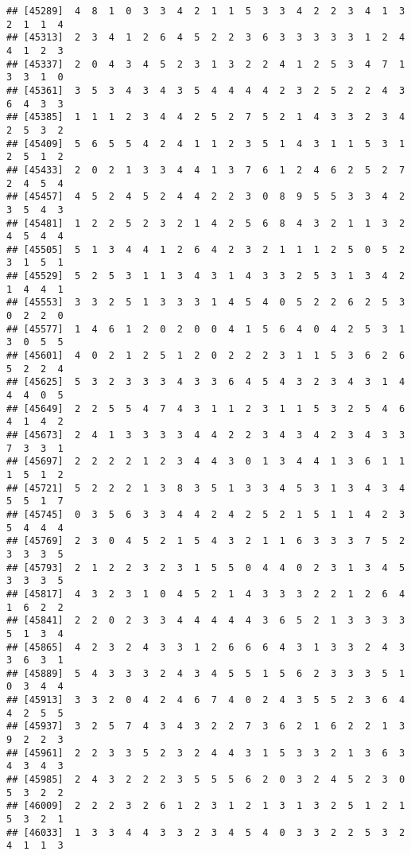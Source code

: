 \documentclass[
]{article}
\begin{document}
\begin{verbatim}
## [45289]  4  8  1  0  3  3  4  2  1  1  5  3  3  4  2  2  3  4  1  3  2  1  1  4
## [45313]  2  3  4  1  2  6  4  5  2  2  3  6  3  3  3  3  3  1  2  4  4  1  2  3
## [45337]  2  0  4  3  4  5  2  3  1  3  2  2  4  1  2  5  3  4  7  1  3  3  1  0
## [45361]  3  5  3  4  3  4  3  5  4  4  4  4  2  3  2  5  2  2  4  3  6  4  3  3
## [45385]  1  1  1  2  3  4  4  2  5  2  7  5  2  1  4  3  3  2  3  4  2  5  3  2
## [45409]  5  6  5  5  4  2  4  1  1  2  3  5  1  4  3  1  1  5  3  1  2  5  1  2
## [45433]  2  0  2  1  3  3  4  4  1  3  7  6  1  2  4  6  2  5  2  7  2  4  5  4
## [45457]  4  5  2  4  5  2  4  4  2  2  3  0  8  9  5  5  3  3  4  2  3  5  4  3
## [45481]  1  2  2  5  2  3  2  1  4  2  5  6  8  4  3  2  1  1  3  2  4  5  4  4
## [45505]  5  1  3  4  4  1  2  6  4  2  3  2  1  1  1  2  5  0  5  2  3  1  5  1
## [45529]  5  2  5  3  1  1  3  4  3  1  4  3  3  2  5  3  1  3  4  2  1  4  4  1
## [45553]  3  3  2  5  1  3  3  3  1  4  5  4  0  5  2  2  6  2  5  3  0  2  2  0
## [45577]  1  4  6  1  2  0  2  0  0  4  1  5  6  4  0  4  2  5  3  1  3  0  5  5
## [45601]  4  0  2  1  2  5  1  2  0  2  2  2  3  1  1  5  3  6  2  6  5  2  2  4
## [45625]  5  3  2  3  3  3  4  3  3  6  4  5  4  3  2  3  4  3  1  4  4  4  0  5
## [45649]  2  2  5  5  4  7  4  3  1  1  2  3  1  1  5  3  2  5  4  6  4  1  4  2
## [45673]  2  4  1  3  3  3  3  4  4  2  2  3  4  3  4  2  3  4  3  3  7  3  3  1
## [45697]  2  2  2  2  1  2  3  4  4  3  0  1  3  4  4  1  3  6  1  1  1  5  1  2
## [45721]  5  2  2  2  1  3  8  3  5  1  3  3  4  5  3  1  3  4  3  4  5  5  1  7
## [45745]  0  3  5  6  3  3  4  4  2  4  2  5  2  1  5  1  1  4  2  3  5  4  4  4
## [45769]  2  3  0  4  5  2  1  5  4  3  2  1  1  6  3  3  3  7  5  2  3  3  3  5
## [45793]  2  1  2  2  3  2  3  1  5  5  0  4  4  0  2  3  1  3  4  5  3  3  3  5
## [45817]  4  3  2  3  1  0  4  5  2  1  4  3  3  3  2  2  1  2  6  4  1  6  2  2
## [45841]  2  2  0  2  3  3  4  4  4  4  4  3  6  5  2  1  3  3  3  3  5  1  3  4
## [45865]  4  2  3  2  4  3  3  1  2  6  6  6  4  3  1  3  3  2  4  3  3  6  3  1
## [45889]  5  4  3  3  3  2  4  3  4  5  5  1  5  6  2  3  3  3  5  1  0  3  4  4
## [45913]  3  3  2  0  4  2  4  6  7  4  0  2  4  3  5  5  2  3  6  4  4  2  5  5
## [45937]  3  2  5  7  4  3  4  3  2  2  7  3  6  2  1  6  2  2  1  3  9  2  2  3
## [45961]  2  2  3  3  5  2  3  2  4  4  3  1  5  3  3  2  1  3  6  3  4  3  4  3
## [45985]  2  4  3  2  2  2  3  5  5  5  6  2  0  3  2  4  5  2  3  0  5  3  2  2
## [46009]  2  2  2  3  2  6  1  2  3  1  2  1  3  1  3  2  5  1  2  1  5  3  2  1
## [46033]  1  3  3  4  4  3  3  2  3  4  5  4  0  3  3  2  2  5  3  2  4  1  1  3

\end{verbatim}
\end{document}
